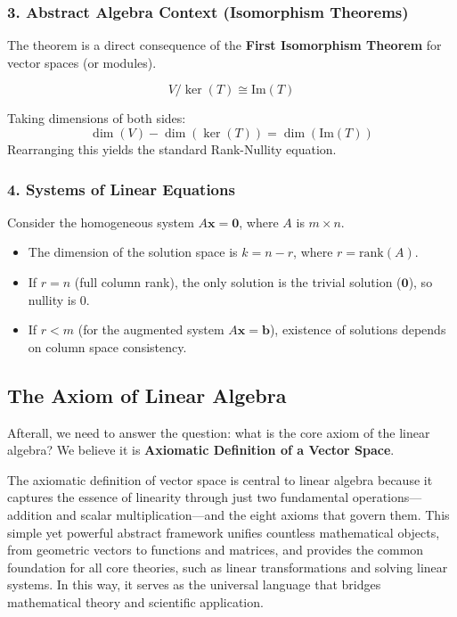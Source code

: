 \subsubsection{3. Abstract Algebra Context (Isomorphism Theorems)}
The theorem is a direct consequence of the \textbf{First Isomorphism Theorem} for vector spaces (or modules).
\begin{theorem}
\[ V / \ker(T) \cong \text{Im}(T) \]
\end{theorem}
Taking dimensions of both sides:
\[ \dim(V) - \dim(\ker(T)) = \dim(\text{Im}(T)) \]
Rearranging this yields the standard Rank-Nullity equation.

\subsubsection{4. Systems of Linear Equations}
Consider the homogeneous system $A\mathbf{x} = \mathbf{0}$, where $A$ is $m \times n$.
\begin{itemize}
    \item The dimension of the solution space is $k = n - r$, where $r = \text{rank}(A)$.
    \item If $r = n$ (full column rank), the only solution is the trivial solution ($\mathbf{0}$), so nullity is 0.
    \item If $r < m$ (for the augmented system $A\mathbf{x}=\mathbf{b}$), existence of solutions depends on column space consistency.
\end{itemize}

\subsection{The Axiom of Linear Algebra}
Afterall, we need to answer the question: what is the core axiom of the linear algebra? We believe it is \textbf{Axiomatic Definition of a Vector Space}.

The axiomatic definition of vector space is central to linear algebra because it captures the essence of linearity through just two fundamental operations—addition and scalar multiplication—and the eight axioms that govern them. This simple yet powerful abstract framework unifies countless mathematical objects, from geometric vectors to functions and matrices, and provides the common foundation for all core theories, such as linear transformations and solving linear systems. In this way, it serves as the universal language that bridges mathematical theory and scientific application.

